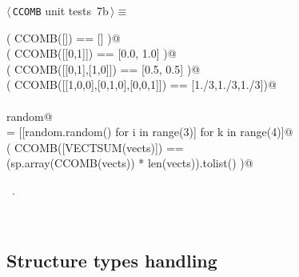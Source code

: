 \documentclass[11pt,oneside]{article}	%
\begin{document}
\begin{flushleft} \small
\begin{minipage}{\linewidth} \label{scrap21}
\protect{}$\langle\,$\texttt{CCOMB} unit tests\nobreak\ {\footnotesize 7b}$\,\rangle\equiv$
\vspace{-1ex}
\begin{list}{}{} \item
\mbox{}\verb@assert( CCOMB([]) == [] )@\\
\mbox{}\verb@assert( CCOMB([[0,1]]) == [0.0, 1.0] )@\\
\mbox{}\verb@assert( CCOMB([[0,1],[1,0]]) == [0.5, 0.5] )@\\
\mbox{}\verb@assert( CCOMB([[1,0,0],[0,1,0],[0,0,1]]) == [1./3,1./3,1./3])@\\
\mbox{}\verb@@\\
\mbox{}\verb@import random@\\
\mbox{}\verb@vects = [[random.random() for i in range(3)] for k in range(4)]@\\
\mbox{}\verb@assert( CCOMB([VECTSUM(vects)]) == \@\\
\mbox{}\verb@        (sp.array(CCOMB(vects)) * len(vects)).tolist() )@\\
\mbox{}\verb@@{\NWsep}
\end{list}
\vspace{-1ex}
\footnotesize\addtolength{\baselineskip}{-1ex}
\begin{list}{}{\setlength{\itemsep}{-\parsep}\setlength{\itemindent}{-\leftmargin}}
\item \NWtxtMacroRefIn\ .
\end{list}
\end{minipage}\\[4ex]
\end{flushleft}





\subsection{Structure types handling}
\end{document}
